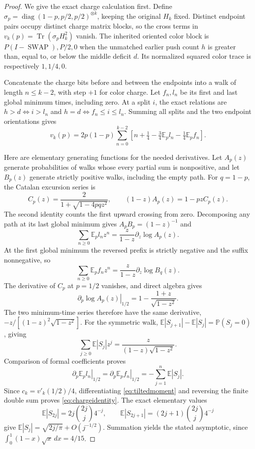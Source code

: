 \documentclass[11pt]{article}
\newcommand{\Tr}{\operatorname{Tr}}
\newcommand{\E}{\mathbb E}
\newcommand{\Prob}{\mathbb P}
\newcommand{\SWAP}{\operatorname{SWAP}}
\begin{document}
\begin{proof}
We give the exact charge calculation first. Define
\(\sigma_p=\operatorname{diag}(1-p,p/2,p/2)^{\otimes k}\), keeping
the original \(H_k\) fixed. Distinct endpoint pairs occupy distinct
charge matrix blocks, so the cross terms in
\(v_k(p)=\Tr(\sigma_pH_k^2)\) vanish.
The inherited oriented color block is \(P(I-\SWAP),P/2,0\) when the
unmatched earlier push count \(h\) is greater than, equal to, or below
the middle deficit \(d\). Its normalized squared color trace is
respectively \(1,1/4,0\).

Concatenate the charge bits before and between the endpoints into a walk
of length \(n\le k-2\), with step \(+1\) for color charge. Let
\(f_n,l_n\) be its first and last global minimum times, including zero.
At a split \(i\), the exact relations are
\(h>d\iff i>l_n\) and \(h=d\iff f_n\le i\le l_n\).
Summing all splits and the two endpoint orientations gives
\begin{equation}\label{eq:tiltedmoment}
 v_k(p)=2p(1-p)\sum_{n=0}^{k-2}
 \left[n+\tfrac14-\tfrac34\E_p l_n-\tfrac14\E_p f_n\right].
\end{equation}

Here are elementary generating functions for the needed derivatives.
Let \(A_p(z)\) generate probabilities of walks whose every partial sum
is nonpositive, and let \(B_p(z)\) generate strictly positive walks,
including the empty path. For \(q=1-p\), the Catalan excursion series is
\[
 C_p(z)=\frac{2}{1+\sqrt{1-4pqz^2}},\qquad
 (1-z)A_p(z)=1-pzC_p(z).
\]
The second identity counts the first upward crossing from zero.
Decomposing any path at its last global minimum gives
\(A_pB_p=(1-z)^{-1}\) and
\[
 \sum_{n\ge0}\E_p l_nz^n
 =\frac{z}{1-z}\partial_z\log A_p(z).
\]
At the first global minimum the reversed prefix is strictly negative
and the suffix nonnegative, so
\[
 \sum_{n\ge0}\E_p f_nz^n
 =\frac{z}{1-z}\partial_z\log B_q(z).
\]
The derivative of \(C_p\) at \(p=1/2\) vanishes, and direct algebra gives
\[
 \left.\partial_p\log A_p(z)\right|_{1/2}
 =1-\frac{1+z}{\sqrt{1-z^2}}.
\]
The two minimum-time series therefore have the same derivative,
\(-z/[(1-z)^2\sqrt{1-z^2}]\). For the symmetric walk,
\(\E|S_{j+1}|-\E|S_j|=\Prob(S_j=0)\), giving
\[
 \sum_{j\ge0}\E|S_j|z^j=\frac{z}{(1-z)\sqrt{1-z^2}}.
\]
Comparison of formal coefficients proves
\[
 \left.\partial_p\E_p l_n\right|_{1/2}
 =\left.\partial_p\E_p f_n\right|_{1/2}
 =-\sum_{j=1}^n\E|S_j|.
\]
Since \(c_k=v'_k(1/2)/4\), differentiating
\eqref{eq:tiltedmoment} and reversing the finite double sum proves
\eqref{eq:chargeidentity}. The exact elementary values
\[
 \E|S_{2j}|=2j\binom{2j}{j}4^{-j},\qquad
 \E|S_{2j+1}|=(2j+1)\binom{2j}{j}4^{-j}
\]
give \(\E|S_j|=\sqrt{2j/\pi}+O(j^{-1/2})\). Summation yields the
stated asymptotic, since \(\int_0^1(1-x)\sqrt x\,dx=4/15\).


\end{proof}
\end{document}
